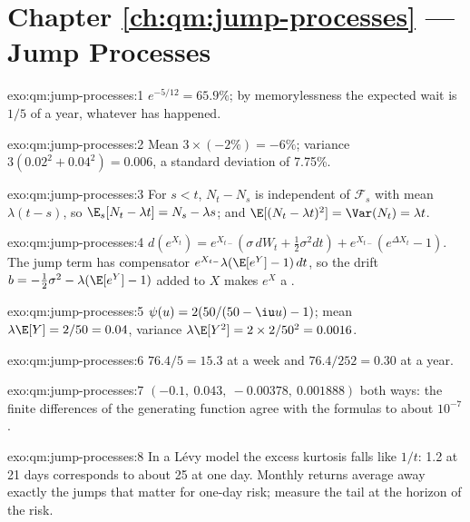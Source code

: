 \section*{Chapter \ref{ch:qm:jump-processes} --- Jump Processes}

\begin{solution}{exo:qm:jump-processes:1}
$e^{-5/12} = 65.9\%$; by memorylessness the expected wait is $1/5$ of a year, whatever has happened.
\end{solution}

\begin{solution}{exo:qm:jump-processes:2}
Mean $3 \times (-2\%) = -6\%$; variance $3(0.02^2 + 0.04^2) = 0.006$, a standard deviation of 7.75\%.
\end{solution}

\begin{solution}{exo:qm:jump-processes:3}
For $s < t$, $N_t - N_s$ is independent of $\mathcal F_s$ with mean $\lambda(t - s)$, so $\E_s[N_t - \lambda t] = N_s - \lambda s$;
and $\E[(N_t - \lambda t)^2] = \Var(N_t) = \lambda t$.
\end{solution}

\begin{solution}{exo:qm:jump-processes:4}
$d(e^{X_t}) = e^{X_{t-}}(\sigma\,dW_t + \tfrac12\sigma^2dt) + e^{X_{t-}}(e^{\Delta X_t} - 1)$. The jump term has compensator
$e^{X_{t-}}\lambda(\E[e^Y] - 1)\,dt$, so the drift $b = -\tfrac12\sigma^2 - \lambda(\E[e^Y] - 1)$ added to $X$ makes $e^X$ a
.
\end{solution}

\begin{solution}{exo:qm:jump-processes:5}
$\psi(u) = 2(50/(50 - \iu u) - 1)$; mean $\lambda\E[Y] = 2/50 = 0.04$, variance $\lambda\E[Y^2] = 2 \times 2/50^2 = 0.0016$.
\end{solution}

\begin{solution}{exo:qm:jump-processes:6}
$76.4/5 = 15.3$ at a week and $76.4/252 = 0.30$ at a year.
\end{solution}

\begin{solution}{exo:qm:jump-processes:7}
$(-0.1,\ 0.043,\ -0.00378,\ 0.001888)$ both ways: the finite differences of the  generating
function agree with the formulas to about $10^{-7}$.
\end{solution}

\begin{solution}{exo:qm:jump-processes:8}
In a Lévy model the excess kurtosis falls like $1/t$: 1.2 at 21 days corresponds to about 25 at one day.
Monthly returns average away exactly the jumps that matter for one-day risk; measure the tail at the
horizon of the risk.
\end{solution}

